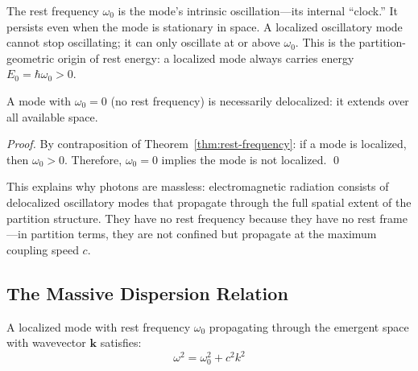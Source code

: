 \begin{remark}
The rest frequency $\omega_0$ is the mode's intrinsic oscillation---its internal ``clock.'' It persists even when the mode is stationary in space. A localized oscillatory mode cannot stop oscillating; it can only oscillate at or above $\omega_0$. This is the partition-geometric origin of rest energy: a localized mode always carries energy $E_0 = \hbar\omega_0 > 0$.
\end{remark}

\begin{corollary}
\label{cor:massless-delocalized}
A mode with $\omega_0 = 0$ (no rest frequency) is necessarily delocalized: it extends over all available space.
\end{corollary}

\begin{proof}
By contraposition of Theorem~\ref{thm:rest-frequency}: if a mode is localized, then $\omega_0 > 0$. Therefore, $\omega_0 = 0$ implies the mode is not localized. \qed
\end{proof}

\begin{remark}
This explains why photons are massless: electromagnetic radiation consists of delocalized oscillatory modes that propagate through the full spatial extent of the partition structure. They have no rest frequency because they have no rest frame---in partition terms, they are not confined but propagate at the maximum coupling speed $c$.
\end{remark}

\subsection{The Massive Dispersion Relation}

\begin{theorem}
\label{thm:massive-dispersion}
A localized mode with rest frequency $\omega_0$ propagating through the emergent space with wavevector $\mathbf{k}$ satisfies:
\begin{equation}
    \omega^2 = \omega_0^2 + c^2 k^2
    \label{eq:massive-dispersion}
\end{equation}
\end{theorem}

